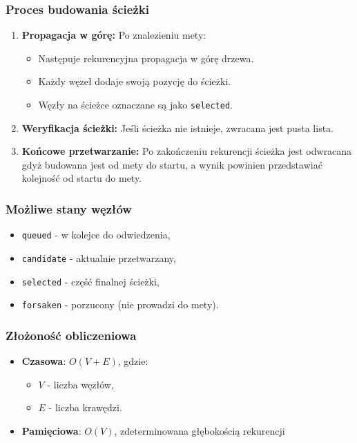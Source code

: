 \documentclass[../../../../doc.tex]{subfiles}
\begin{document}
\vspace{-16pt}

\subsubsection{Proces budowania ścieżki}
\begin{enumerate}
  \item \textbf{Propagacja w górę:} Po znalezieniu mety:
        \begin{itemize}
          \item Następuje rekurencyjna propagacja w górę drzewa.
          \item Każdy węzeł dodaje swoją pozycję do ścieżki.
          \item Węzły na ścieżce oznaczane są jako \texttt{selected}.
        \end{itemize}
  \item \textbf{Weryfikacja ścieżki:} Jeśli ścieżka nie istnieje, zwracana jest pusta lista.
  \item \textbf{Końcowe przetwarzanie:} Po zakończeniu rekurencji ścieżka jest odwracana gdyż budowana jest od mety do startu, a wynik powinien przedstawiać kolejność od startu do mety.
\end{enumerate}

\subsubsection{Możliwe stany węzłów}
\begin{itemize}
  \item \texttt{queued} - w kolejce do odwiedzenia,
  \item \texttt{candidate} - aktualnie przetwarzany,
  \item \texttt{selected} - część finalnej ścieżki,
  \item \texttt{forsaken} - porzucony (nie prowadzi do mety).
\end{itemize}

\subsubsection{Złożoność obliczeniowa}
\begin{itemize}
  \item \textbf{Czasowa}: $O(V + E)$, gdzie:
        \begin{itemize}
          \item $V$ - liczba węzłów,
          \item $E$ - liczba krawędzi.
        \end{itemize}
  \item \textbf{Pamięciowa}: $O(V)$, zdeterminowana głębokością rekurencji
\end{itemize}
\end{document}
